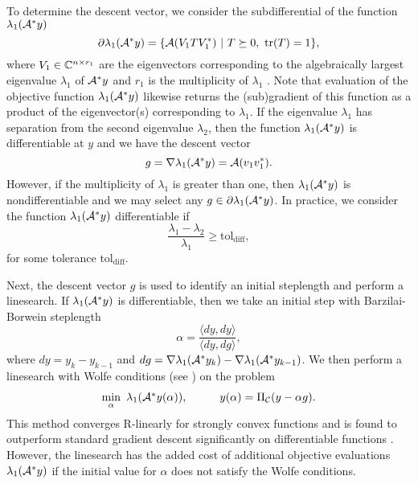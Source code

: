 To determine the descent vector, we consider the subdifferential of the function $ \lambda_1({\mathcal A}^*y)$ 
\begin{equation} 		\label{Eqn:GD-subdifferential}
\partial \lambda_1({\mathcal A}^* y) = \{  {\mathcal A}(V_1 T V_1^*) \ | \ T \succeq 0, \ \mathrm{tr}(T) = 1 \},
\end{equation}
where $V_1 \in {\mathbb C}^{n \times r_1}$ are the eigenvectors corresponding to the algebraically largest eigenvalue $\lambda_1$ of ${\mathcal A}^* y$ and $r_1$ is the multiplicity of $\lambda_1$ \cite[Section 6.7]{parikh2014proximal}.  Note that evaluation of the objective function $\lambda_1({\mathcal A}^* y)$ likewise returns the (sub)gradient of this function as a product of the eigenvector(s) corresponding to $\lambda_1$.  If the eigenvalue $\lambda_1$ has separation from the second eigenvalue $\lambda_2$, then the function $\lambda_1({\mathcal A}^* y)$ is differentiable at $y$ and we have the descent vector
\begin{equation} 			\label{Eqn:GD-gradient}
g = \nabla \lambda_1({\mathcal A}^* y) = {\mathcal A}(v_1 v_1^*).
\end{equation}
However, if the multiplicity of $\lambda_1$ is greater than one, then $\lambda_1({\mathcal A}^*y)$ is nondifferentiable and we may select any $g \in \partial \lambda_1({\mathcal A}^*y)$.  In practice, we consider the function $\lambda_1({\mathcal A}^* y)$ differentiable if 
\begin{equation} 				\label{Eqn:GD-diff_tol}
\frac{\lambda_1 - \lambda_2}{\lambda_1} \geq \text{tol}_\text{diff},
\end{equation}
for some tolerance $\text{tol}_\text{diff}$.



Next, the descent vector $g$ is used to identify an initial steplength and perform a linesearch.  If $\lambda_1({\mathcal A}^* y)$ is differentiable, then we take an initial step with Barzilai-Borwein steplength  \cite{barzilai1988twopoint}
\begin{equation}   			\label{Eqn:Barzilai-Borwein_steplength}
\alpha = \frac{\langle dy, dy \rangle}{\langle dy, dg \rangle},
\end{equation}
where $dy = y_k - y_{k-1}$ and $dg = \nabla \lambda_1({\mathcal A}^* y_k) -  \nabla \lambda_1({\mathcal A}^* y_{k-1}) $.  We then perform a linesearch with Wolfe conditions (see \cite[Section 3.1]{nocedal2006numerical}) on the problem
\begin{equation} 				\label{Eqn:GD-linesearch}
\begin{array}{lr}
\min\limits_\alpha \ \lambda_1({\mathcal A}^*y(\alpha)),
	 	\hspace{1cm} y(\alpha) = \Pi_{\mathcal C} (y - \alpha g).
\end{array}
\end{equation}
This method converges R-linearly for strongly convex functions and is found to outperform standard gradient descent significantly on differentiable functions \cite{zhang2004nonmonotone}.  However, the linesearch has the added cost of additional objective evaluations $\lambda_1({\mathcal A}^* y)$ if the initial value for $\alpha$ does not satisfy the Wolfe conditions.







